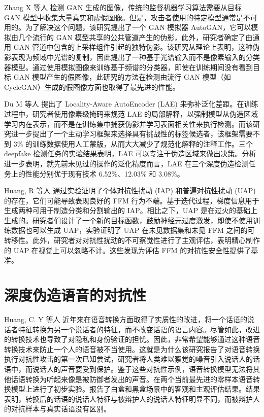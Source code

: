 Zhang X 等人 \cite{zhang2019detecting} 检测 GAN 生成的图像，传统的监督机器学习算法需要从目标 GAN 模型中收集大量真实和虚假图像。但是，攻击者使用的特定模型通常是不可用的。为了解决这个问题，该研究提出了一个 GAN 模拟器 AutoGAN，它可以模拟由几个流行的 GAN 模型共享的公共管道产生的伪影，此外，研究者确定了由通用 GAN 管道中包含的上采样组件引起的独特伪影。该研究从理论上表明，这种伪影表现为频域中光谱的复制，因此提出了一种基于光谱输入而不是像素输入的分类器模型。通过使用模拟图像来训练基于频谱的分类器，即使在训练期间没有看到目标 GAN 模型产生的假图像，此研究的方法在检测由流行 GAN 模型（如 CycleGAN）生成的假图像方面也取得了最先进的性能。

Du M 等人 \cite{du2019towards} 提出了 Locality-Aware AutoEncoder (LAE) 来弥补泛化差距。在训练过程中，研究者使用像素级掩码来规范 LAE 的局部解释，以强制模型从伪造区域学习内在表示，而不是在训练集中捕获伪影并学习表面相关性来执行检测。而该研究进一步提出了一个主动学习框架来选择具有挑战性的标签候选者，该框架需要不到 3\% 的训练数据使用人工蒙版，从而大大减少了规范化解释的注释工作。三个 deepfake 检测任务的实验结果表明，LAE 可以专注于伪造区域来做出决策。分析进一步表明，就先前未见过的操作的泛化精度而言，LAE 在三个深度伪造检测任务上的性能分别优于现有技术 6.52\%、12.03\% 和 3.08\%。

Huang, R 等人 \cite{huang2020security} 通过实验证明了个体对抗性扰动 (IAP) 和普遍对抗性扰动 (UAP) 的存在，它们可能导致表现良好的 FFM 行为不端。基于迭代过程，梯度信息用于生成两种可用于制造分类和分割输出的 IAP。相比之下，UAP 是在过火的基础上生成的。研究者们设计了一个新的目标函数，鼓励神经元过度激发，即使不使用训练数据也可以生成 UAP，实验证明了 UAP 在未见数据集和未见 FFM 之间的可转移性。此外，研究者对对抗性扰动的不可察觉性进行了主观评估，表明精心制作的 UAP 在视觉上可以忽略不计。这些发现为评估 FFM 的对抗性安全性提供了基准。

\section{深度伪造语音的对抗性}

Huang, C. Y 等人 \cite{9383529} 近年来在语音转换方面取得了实质性的改进，将一个话语的说话者特征转换为另一个说话者的特征，而不改变话语的语言内容。尽管如此，改进的转换技术也导致了对隐私和身份验证的担忧。因此，非常希望能够通过这种语音转换技术来防止一个人的语音被不当使用。这就是为什么该研究报告了对语音转换执行对抗性攻击的第一次已知尝试，研究者将人类难以察觉的噪音引入说话人的话语中，而说话人的声音要受到保护。鉴于这些对抗性示例，语音转换模型无法将其他话语转换为听起来像是被防御者发出的声音。在两个当前最先进的零样本语音转换模型上进行了初步实验。报告了白盒和黑盒场景中的客观和主观评估结果。结果表明，转换后的话语的说话人特征与被辩护人的说话人特征明显不同，而被辩护人的对抗样本与真实话语没有区别。

